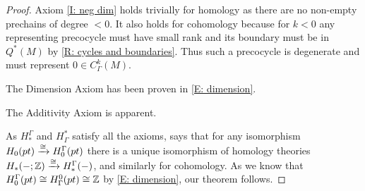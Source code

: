 \begin{proof}
	Axiom \ref{I: neg dim} holds trivially for homology as there are no non-empty prechains of degree $<0$.
	It also holds for cohomology because for $k<0$ any representing precocycle must have small rank and its boundary must be in $Q^*(M)$ by \cref{R: cycles and boundaries}.
	Thus such a precocycle is degenerate and must represent $0 \in C^k_\Gamma(M)$.

	The Dimension Axiom has been proven in \cref{E: dimension}.

	The Additivity Axiom is apparent.

	As $H_*^\Gamma$ and $H^*_\Gamma$ satisfy all the axioms, \cite[Proposition 10]{Krec10b} says that for any isomorphism $H_0(pt) \xrightarrow{\cong} H^\Gamma_0(pt)$ there is a unique isomorphism of homology theories $H_*(- ;\mathbb{Z}) \xrightarrow{\cong} H_*^\Gamma(-)$, and similarly for cohomology.
	As we know that $H_0^\Gamma(pt) \cong H_\Gamma^0(pt) \cong \mathbb{Z}$ by \cref{E: dimension}, our theorem follows.
\end{proof}

